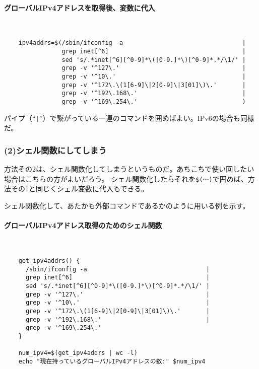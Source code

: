 \paragraph{グローバルIPv4アドレスを取得後、変数に代入} 　\\
\begin{frameboxit}{160.0mm}
\begin{verbatim}
	ipv4addrs=$(/sbin/ifconfig -a                                 |
	            grep inet[^6]                                     |
	            sed 's/.*inet[^6][^0-9]*\([0-9.]*\)[^0-9]*.*/\1/' |
	            grep -v '^127\.'                                  |
	            grep -v '^10\.'                                   |
	            grep -v '^172\.\(1[6-9]\|2[0-9]\|3[01]\)\.'       |
	            grep -v '^192\.168\.'                             |
	            grep -v '^169\.254\.'                             )
\end{verbatim}
\end{frameboxit}

パイプ（``\verb!|!''）で繋がっている一連のコマンドを囲めばよい。IPv6の場合も同様だ。

\subsubsection*{(2)シェル関数にしてしまう}

方法その2は、シェル関数化してしまうというものだ。あちこちで使い回したい場合はこちらの方がよいだろう。
シェル関数化したらそれを\verb|$(～)|で囲めば、方法その1と同じくシェル変数に代入もできる。

シェル関数化して、あたかも外部コマンドであるかのように用いる例を示す。

\paragraph{グローバルIPv4アドレス取得のためのシェル関数} 　\\
\begin{frameboxit}{160.0mm}
\begin{verbatim}
	get_ipv4addrs() {
	  /sbin/ifconfig -a                                 |
	  grep inet[^6]                                     |
	  sed 's/.*inet[^6][^0-9]*\([0-9.]*\)[^0-9]*.*/\1/' |
	  grep -v '^127\.'                                  |
	  grep -v '^10\.'                                   |
	  grep -v '^172\.\(1[6-9]\|2[0-9]\|3[01]\)\.'       |
	  grep -v '^192\.168\.'                             |
	  grep -v '^169\.254\.'
	}

	num_ipv4=$(get_ipv4addrs | wc -l)
	echo "現在持っているグローバルIPv4アドレスの数:" $num_ipv4
\end{verbatim}
\end{frameboxit}

